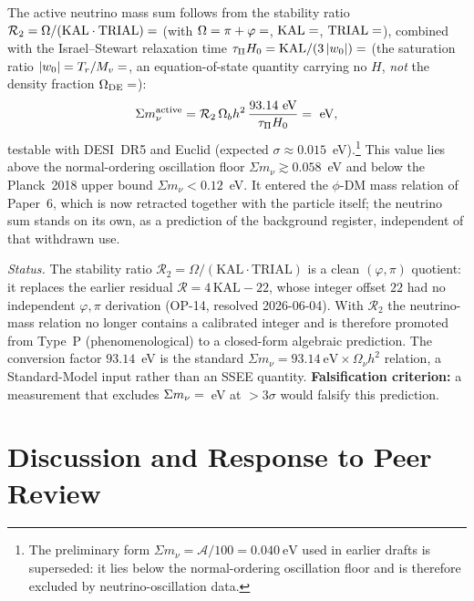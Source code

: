 \documentclass[12pt,a4paper]{article}
\begin{document}
The active neutrino mass sum follows from the stability ratio
$\mathcal{R}_2 = \Omega/(\mathrm{KAL}\cdot\mathrm{TRIAL}) = \val{R2_STABILITY_d6}$
(with $\Omega=\pi+\varphi=\val{OMEGA_d6}$, $\mathrm{KAL}=\val{KAL0_d6}$, $\mathrm{TRIAL}=\val{T_R_d6}$),
combined with the Israel--Stewart relaxation time
$\tau_\Pi H_0 = \mathrm{KAL}/(3\,|w_0|) = \val{TAU_PI_H0_d3}$ (the saturation
ratio $|w_0|=T_r/M_v=\val{S_DE_d6}$, an equation-of-state quantity carrying no
$H$, \emph{not} the density fraction $\Omega_{\rm DE}=\val{OMDE_DENS_d6}$):
\begin{equation}
  \Sigma m_\nu^{\rm active}
    = \mathcal{R}_2\,\Omega_b h^2\,\frac{93.14~\mathrm{eV}}{\tau_\Pi H_0}
    = \val{SUM_MNU_EV_d4}~\mathrm{eV},
\end{equation}
testable with DESI~DR5 and Euclid (expected $\sigma\approx 0.015$~eV).\footnote{%
The preliminary form $\Sigma m_\nu=\mathcal{A}/100=0.040~\mathrm{eV}$ used in
earlier drafts is superseded: it lies below the normal-ordering oscillation floor
and is therefore excluded by neutrino-oscillation data.}
This value lies above the normal-ordering oscillation floor
$\Sigma m_\nu\gtrsim0.058$~eV and below the Planck~2018 upper bound
$\Sigma m_\nu<0.12$~eV. It entered the $\phi$-DM mass relation of Paper~6, which is now retracted
together with the particle itself; the neutrino sum stands on its own, as a
prediction of the background register, independent of that withdrawn use.

\emph{Status.} The stability ratio $\mathcal{R}_2=\Omega/(\mathrm{KAL}\cdot\mathrm{TRIAL})$
is a clean $(\varphi,\pi)$ quotient: it replaces the earlier residual
$\mathcal{R}=4\,\mathrm{KAL}-22$, whose integer offset $22$ had no independent
$\varphi,\pi$ derivation (OP-14, resolved 2026-06-04). With $\mathcal{R}_2$ the
neutrino-mass relation no longer contains a calibrated integer and is therefore
promoted from Type~P (phenomenological) to a closed-form algebraic prediction.
The conversion factor $93.14$~eV is the standard $\Sigma m_\nu=93.14~\mathrm{eV}\times
\Omega_\nu h^2$ relation, a Standard-Model input rather than an SSEE quantity.
\textbf{Falsification criterion:} a measurement that excludes $\Sigma m_\nu=\val{SUM_MNU_EV_d4}$~eV at
$>3\sigma$ would falsify this prediction.

\section{Discussion and Response to Peer Review}
\label{sec:discussion}
\end{document}
